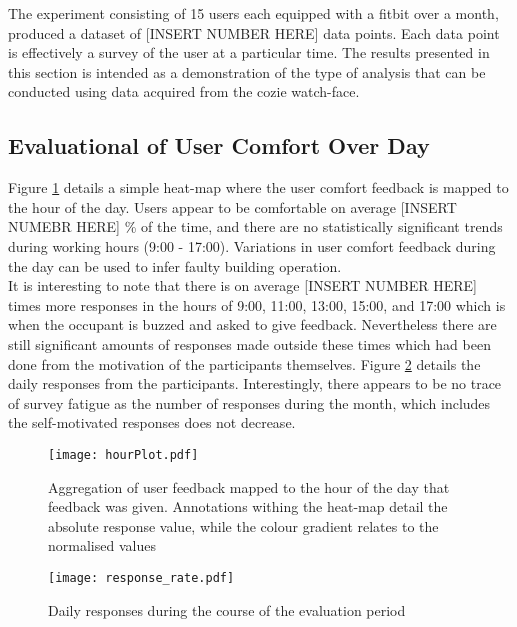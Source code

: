 
The experiment consisting of 15 users each equipped with a fitbit over a month, produced a dataset of [INSERT NUMBER HERE] data points. Each data point is effectively a survey of the user at a particular time. The results presented in this section is intended as a demonstration of the type of analysis that can be conducted using data acquired from the cozie watch-face.


\subsection{Evaluational of User Comfort Over Day}

Figure \ref{fig:hourPlot} details a simple heat-map where the user comfort feedback is mapped to the hour of the day. Users appear to be comfortable on average [INSERT NUMEBR HERE] \% of the time, and there are no statistically significant trends during working hours (9:00 - 17:00). Variations in user comfort feedback during the day can be used to infer faulty building operation.\\

It is interesting to note that there is on average [INSERT NUMBER HERE] times more responses in the hours of 9:00, 11:00, 13:00, 15:00, and 17:00 which is when the occupant is buzzed and asked to give feedback. Nevertheless there are still significant amounts of responses made outside these times which had been done from the motivation of the participants themselves. Figure \ref{fig:responseRate} details the daily responses from the participants. Interestingly, there appears to be no trace of survey fatigue as the number of responses during the month, which includes the self-motivated responses does not decrease.

\begin{figure}
\begin{center}
\texttt{[image: hourPlot.pdf]}
\caption{Aggregation of user feedback mapped to the hour of the day that feedback was given. Annotations withing the heat-map detail the absolute response value, while the colour gradient relates to the normalised values}
\label{fig:hourPlot}
\end{center}
\end{figure}

\begin{figure}
\begin{center}
\texttt{[image: response\_rate.pdf]}
\caption{Daily responses during the course of the evaluation period}
\label{fig:responseRate}
\end{center}
\end{figure}

